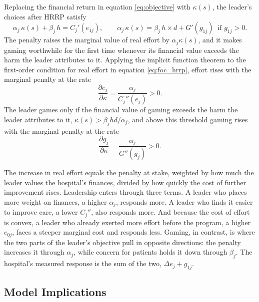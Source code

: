 \documentclass[12pt]{article}
\theoremstyle{definition}   %
\begin{document}
    Replacing the financial return in equation \eqref{eq:objective} with $\kappa(s)$, the leader's choices after HRRP satisfy
    \begin{equation}\label{eq:foc_hrrp}
        \alpha_j \, \kappa(s) + \beta_j \, h = C_j'(e_{1j}), \qquad \alpha_j \, \kappa(s) = \beta_j \, h \times d + G'(g_{1j}) \ \text{ if } g_{1j} > 0.
    \end{equation}
    The penalty raises the marginal value of real effort by $\alpha_j \kappa(s)$, and it makes gaming worthwhile for the first time whenever its financial value exceeds the harm the leader attributes to it. Applying the implicit function theorem to the first-order condition for real effort in equation \eqref{eq:foc_hrrp}, effort rises with the marginal penalty at the rate
    \begin{equation}\label{eq:response_e}
        \frac{\partial e_j}{\partial \kappa} = \frac{\alpha_j}{C_j''(e_j)} > 0.
    \end{equation}
    The leader games only if the financial value of gaming exceeds the harm the leader attributes to it, $\kappa(s) > \beta_j h d / \alpha_j$, and above this threshold gaming rises with the marginal penalty at the rate
    \begin{equation}\label{eq:response_g}
        \frac{\partial g_j}{\partial \kappa} = \frac{\alpha_j}{G''(g_j)} > 0.
    \end{equation}

    The increase in real effort equals the penalty at stake, weighted by how much the leader values the hospital's finances, divided by how quickly the cost of further improvement rises. Leadership enters through three terms. A leader who places more weight on finances, a higher $\alpha_j$, responds more. A leader who finds it easier to improve care, a lower $C_j''$, also responds more. And because the cost of effort is convex, a leader who already exerted more effort before the program, a higher $e_{0j}$, faces a steeper marginal cost and responds less. Gaming, in contrast, is where the two parts of the leader's objective pull in opposite directions: the penalty increases it through $\alpha_j$, while concern for patients holds it down through $\beta_j$. The hospital's measured response is the sum of the two, $\Delta e_j + g_{1j}$.

    \subsection{Model Implications}
\end{document}
